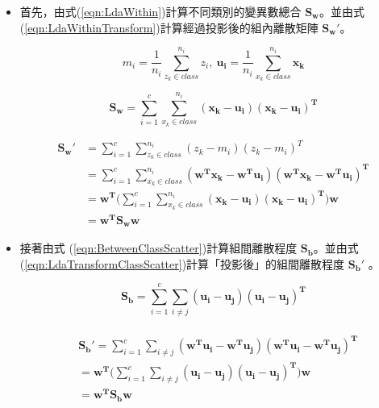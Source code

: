 \begin{itemize}
	\item
	      首先，由式(\ref{eqn:LdaWithin})計算不同類別的變異數總合 \(\mathbf{S_w}\)。並由式(\ref{eqn:LdaWithinTransform})計算經過投影後的組內離散矩陣 \(\mathbf{{S_w}'}\)。


	      \begin{equation}
		      \label{eqn:LdaAvg}
			  m_i = \frac{1}{n_i}\sum^{n_i}_{z_k \in class }z_i, \ \mathbf{u_i} = \frac{1}{n_i}\sum_{x_k \in class}^{n_i} \mathbf{x_k}
	      \end{equation}

	      \begin{equation}
		      \label{eqn:LdaWithin}
		      \mathbf{S_w}  =\sum_{i=1}^{c} \sum^{n_i}_{x_k\in class}  \mathbf{(x_k - u_i)(x_k-u_i)^T}
	      \end{equation}

	      \begin{equation}
		      \label{eqn:LdaWithinTransform}
		      \begin{aligned}
			      \mathbf{{S_w}'} & =\sum_{i=1}^{c} \sum^{n_i}_{z_k\in class}  (z_k-m_i)(z_k-m_i)^T
				  \\& =\sum_{i=1}^{c} \sum^{n_i}_{x_k\in class}  \mathbf{(w^Tx_k - w^Tu_i)(w^Tx_k-w^Tu_i)^T}
			      \\& =\mathbf{w^T}(\sum_{i=1}^{c} \sum^{n_i}_{x_k\in class} \mathbf{ (x_k - u_i)(x_k-u_i)^T)w}
			      \\& =\mathbf{w^TS_ww}
		      \end{aligned}
	      \end{equation}


	\item
		接著由式 (\ref{eqn:BetweenClassScatter})計算組間離散程度 \(\mathbf{S_b}\)。並由式 (\ref{eqn:LdaTransformClassScatter})計算「投影後」的組間離散程度 \(\mathbf{{S_b}'}\) 。

	      \begin{equation}
		      \label{eqn:BetweenClassScatter}
		      \mathbf{S_b} =\sum_{i=1}^{c}\sum_{i \neq j } \mathbf{(u_i - u_j)(u_i - u_j)^T}
	      \end{equation}

	      \begin{equation}
		      \label{eqn:LdaTransformClassScatter}
		      \begin{aligned}
			      \\&\mathbf{{S_b}'} =\sum_{i=1}^{c}\sum_{i \neq j } \mathbf{(w^Tu_i - w^Tu_j)(w^Tu_i - w^Tu_j)^T}
			      \\& =\mathbf{w^T}(\sum_{i=1}^{c}\sum_{i \neq j } \mathbf{(u_i - u_j)(u_i - u_j)^T)w}
			      \\& =\mathbf{w^TS_bw}
		      \end{aligned}
	      \end{equation}




\end{itemize}

